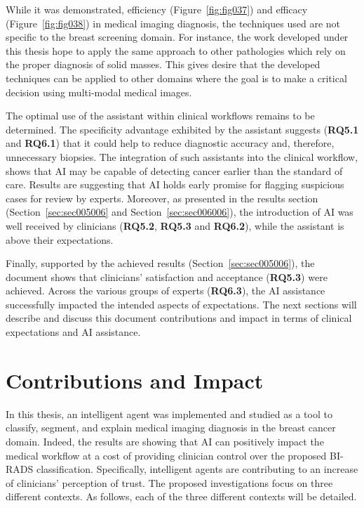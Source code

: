 While it was demonstrated, efficiency (Figure~\ref{fig:fig037}) and efficacy (Figure~\ref{fig:fig038}) in medical imaging diagnosis, the techniques used are not specific to the breast screening domain.
For instance, the work developed under this thesis hope to apply the same approach to other pathologies which rely on the proper diagnosis of solid masses.
This gives desire that the developed techniques can be applied to other domains where the goal is to make a critical decision using multi-modal medical images.

The optimal use of the assistant within clinical workflows remains to be determined.
The specificity advantage exhibited by the assistant suggests ({\bf RQ5.1} and {\bf RQ6.1}) that it could help to reduce diagnostic accuracy and, therefore, unnecessary biopsies.
The integration of such assistants into the clinical workflow, shows that \ac{AI} may be capable of detecting cancer earlier than the standard of care.
Results are suggesting that \ac{AI} holds early promise for flagging suspicious cases for review by experts.
Moreover, as presented in the results section (Section~\ref{sec:sec005006} and Section~\ref{sec:sec006006}), the introduction of \ac{AI} was well received by clinicians ({\bf RQ5.2}, {\bf RQ5.3} and {\bf RQ6.2}), while the assistant is above their expectations.

Finally, supported by the achieved results (Section~\ref{sec:sec005006}), the document shows that clinicians' satisfaction and acceptance ({\bf RQ5.3}) were achieved.
Across the various groups of experts ({\bf RQ6.3}), the \ac{AI} assistance successfully impacted the intended aspects of expectations.
The next sections will describe and discuss this document contributions and impact in terms of clinical expectations and \ac{AI} assistance.

\section{Contributions and Impact}
\label{sec:sec007002}

In this thesis, an intelligent agent was implemented and studied as a tool to classify, segment, and explain medical imaging diagnosis in the breast cancer domain.
Indeed, the results are showing that \ac{AI} can positively impact the medical workflow at a cost of providing clinician control over the proposed \ac{BI-RADS} classification.
Specifically, intelligent agents are contributing to an increase of clinicians' perception of trust.
The proposed investigations focus on three different contexts.
As follows, each of the three different contexts will be detailed.

